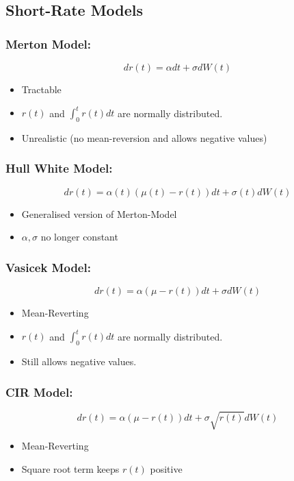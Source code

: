 \documentclass[11pt]{article}
\begin{document}
	\subsection{Short-Rate Models}
	\subsubsection{Merton Model:}
	\[	
		dr(t) = \alpha dt + \sigma dW(t)
			\]
	\begin{itemize}
		\item Tractable
		\item \( r(t) \) and \(\int_{0}^{t} r(t)dt \) are normally distributed.
		\item Unrealistic (no mean-reversion and allows negative values)
		\end{itemize}
	\subsubsection{Hull White Model:}
	\[	
		dr(t) = \alpha(t)(\mu(t) - r(t))dt + \sigma(t)dW(t)
		\]
	\begin{itemize}
		\item Generalised version of Merton-Model
		\item \( \alpha,\sigma \) no longer constant
		\end{itemize}
	\subsubsection{Vasicek Model:}
	\[	dr(t) = \alpha (\mu - r(t)) dt + \sigma dW(t)
		\]
	\begin{itemize}
		\item Mean-Reverting
		\item \( r(t) \) and \(\int_{0}^{t} r(t)dt \) are normally distributed.
		\item Still allows negative values.
		\end{itemize}
	\subsubsection{CIR Model:}
	\[	dr(t) = \alpha(\mu - r(t))dt + \sigma\sqrt{r(t)} dW(t)
		\]
		\begin{itemize}
		\item Mean-Reverting
		\item Square root term keeps \( r(t) \) positive
	\end{itemize}
\end{document}
